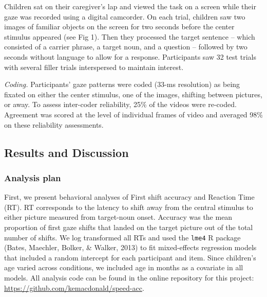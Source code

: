 \documentclass[10pt, letterpaper]{article}
\begin{document}
Children sat on their caregiver's lap and viewed the task on a screen
while their gaze was recorded using a digital camcorder. On each trial,
children saw two images of familiar objects on the screen for two
seconds before the center stimulus appeared (see Fig 1). Then they
processed the target sentence -- which consisted of a carrier phrase, a
target noun, and a question -- followed by two seconds without language
to allow for a response. Participants saw 32 test trials with several
filler trials interspersed to maintain interest.

\emph{Coding.} Participants' gaze patterns were coded (33-ms resolution)
as being fixated on either the center stimulus, one of the images,
shifting between pictures, or away. To assess inter-coder reliability,
25\% of the videos were re-coded. Agreement was scored at the level of
individual frames of video and averaged 98\% on these reliability
assessments.

\subsection{Results and Discussion}\label{results-and-discussion}

\subsubsection{Analysis plan}\label{analysis-plan}

First, we present behavioral analyses of First shift accuracy and
Reaction Time (RT). RT corresponds to the latency to shift away from the
central stimulus to either picture measured from target-noun onset.
Accuracy was the mean proportion of first gaze shifts that landed on the
target picture out of the total number of shifts. We log transformed all
RTs and used the \texttt{lme4} R package (Bates, Maechler, Bolker, \&
Walker, 2013) to fit mixed-effects regression models that included a
random intercept for each participant and item. Since children's age
varied across conditions, we included age in months as a covariate in
all models. All analysis code can be found in the online repository for
this project: \url{https://github.com/kemacdonald/speed-acc}.
\end{document}
